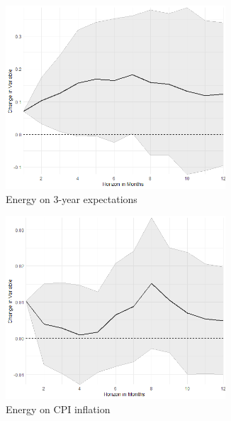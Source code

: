 \begin{figure}
\begin{subfigure}{00.24\textwidth}
		\includegraphics[width=0.9\textwidth]{output/lp/baseline/level/energy/energyonexpectations3y_djn.png}
		\caption{Energy on 3-year expectations}
	\end{subfigure}
	\begin{subfigure}{00.24\textwidth}
		\includegraphics[width=0.9\textwidth]{output/lp/baseline/level/energy/energyoninflation_djn.png}
		\caption{Energy on CPI inflation}
	\end{subfigure}
	\begin{subfigure}{00.24\textwidth}

\end{subfigure}
\end{figure}

